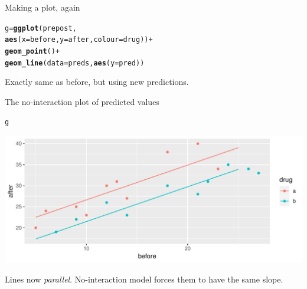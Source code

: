 \documentclass[unknownkeysallowed]{beamer}\usepackage[]{graphicx}\usepackage[]{color}
\makeatletter
\def\maxwidth{ %
  \ifdim\Gin@nat@width>\linewidth
    \linewidth
  \else
    \Gin@nat@width
  \fi
}
\newcommand{\hlopt}[1]{\textcolor[rgb]{0,0,0}{#1}}%
\newcommand{\hlstd}[1]{\textcolor[rgb]{0.345,0.345,0.345}{#1}}%
\newcommand{\hlkwb}[1]{\textcolor[rgb]{0.69,0.353,0.396}{#1}}%
\newcommand{\hlkwc}[1]{\textcolor[rgb]{0.333,0.667,0.333}{#1}}%
\newcommand{\hlkwd}[1]{\textcolor[rgb]{0.737,0.353,0.396}{\textbf{#1}}}%
\newenvironment{kframe}{%
 \def\at@end@of@kframe{}%
 \ifinner\ifhmode%
  \def\at@end@of@kframe{\end{minipage}}%
  \begin{minipage}{\columnwidth}%
 \fi\fi%
 \def\FrameCommand##1{\hskip\@totalleftmargin \hskip-\fboxsep
 \colorbox{shadecolor}{##1}\hskip-\fboxsep
     \hskip-\linewidth \hskip-\@totalleftmargin \hskip\columnwidth}%
 \MakeFramed {\advance\hsize-\width
   \@totalleftmargin\z@ \linewidth\hsize
   \@setminipage}}%
 {\par\unskip\endMakeFramed%
 \at@end@of@kframe}
\newenvironment{knitrout}{}{} %
\makeatother
\begin{document}
\begin{frame}[fragile]{Making a plot, again}

 
\begin{knitrout}
\color{fgcolor}\begin{kframe}
\begin{alltt}
\hlstd{g}\hlkwb{=}\hlkwd{ggplot}\hlstd{(prepost,}
  \hlkwd{aes}\hlstd{(}\hlkwc{x}\hlstd{=before,}\hlkwc{y}\hlstd{=after,}\hlkwc{colour}\hlstd{=drug))}\hlopt{+}
  \hlkwd{geom_point}\hlstd{()}\hlopt{+}
  \hlkwd{geom_line}\hlstd{(}\hlkwc{data}\hlstd{=preds,}\hlkwd{aes}\hlstd{(}\hlkwc{y}\hlstd{=pred))}
\end{alltt}
\end{kframe}
\end{knitrout}
 

Exactly same as before, but using new predictions.
  
\end{frame}

\begin{frame}{The no-interaction plot of predicted values}
  
 
\begin{knitrout}
\color{fgcolor}\begin{kframe}
\begin{alltt}
\hlstd{g}
\end{alltt}
\end{kframe}
\includegraphics[width=\maxwidth]{figure/cabazzo-1} 

\end{knitrout}


Lines now \emph{parallel}. No-interaction model forces them
to have the same slope. 

\end{frame}
\end{document}
